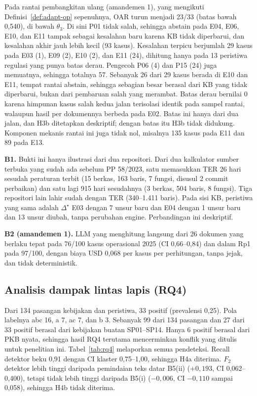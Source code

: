 \documentclass[conference]{IEEEtran}
\makeatletter
\DeclareRobustCommand{\en}[1]{{\usefont{\f@encoding}{\f@family}{\f@series}{it}#1\/}}
\newcommand{\emas}{\star}
\makeatother
\begin{document}
Pada rantai pembangkitan ulang (amandemen 1), yang mengikuti Definisi~\ref{def:adapt-op} sepenuhnya, OAR turun menjadi 23/33 (batas bawah 0,540), di bawah $\theta_3$. Di sini P01 tidak salah, sehingga \en{abstain} pada E04, E06, E10, dan E11 tampak sebagai kesalahan baru karena KB tidak diperbarui, dan kesalahan akhir jauh lebih kecil (93 kasus). Kesalahan terpicu berjumlah 29 kasus pada E03 (1), E09 (2), E10 (2), dan E11 (24), dihitung hanya pada 13 peristiwa regulasi yang punya batas derau. Pengecoh P06 (4) dan P15 (24) juga memuatnya, sehingga totalnya 57. Sebanyak 26 dari 29 kasus berada di E10 dan E11, tempat rantai \en{abstain}, sehingga sebagian besar berasal dari KB yang tidak diperbarui, bukan dari pembaruan salah yang merambat. Batas derau bernilai 0 karena himpunan kasus salah kedua jalan terisolasi identik pada sampel rantai, walaupun hasil per dokumennya berbeda pada E02. Batas ini hanya dari dua jalan, dan H3b ditetapkan deskriptif; dengan batas itu H3b tidak didukung. Komponen mekanis rantai ini juga tidak nol, misalnya 135 kasus pada E11 dan 89 pada E13.

\textbf{B1.} Bukti ini hanya ilustrasi dari dua repositori. Dari dua kalkulator sumber terbuka yang sudah ada sebelum PP 58/2023, satu memasukkan TER 26 hari sesudah peraturan terbit (15 berkas, 163 baris, 7 fungsi, disusul 2 \en{commit} perbaikan) dan satu lagi 915 hari sesudahnya (3 berkas, 504 baris, 8 fungsi). Tiga repositori lain lahir sudah dengan TER (340--1.411 baris). Pada sisi KB, peristiwa yang sama adalah $\Delta^{\emas}$ E03 dengan 7 unsur baru dan E04 dengan 1 unsur baru dan 13 unsur diubah, tanpa perubahan \en{engine}. Perbandingan ini deskriptif.

\textbf{B2 (amandemen 1).} LLM yang menghitung langsung dari 26 dokumen yang berlaku tepat pada 76/100 kasus operasional 2025 (CI 0,66--0,84) dan dalam Rp1 pada 97/100, dengan biaya USD 0,068 per kasus per perhitungan, tanpa jejak, dan tidak deterministik.

\subsection{Analisis dampak lintas lapis (RQ4)}
Dari 134 pasangan kebijakan dan peristiwa, 33 positif (prevalensi 0,25). Pola labelnya abc 16, a 7, ac 7, dan b 3. Sebanyak 99 dari 134 pasangan dan 27 dari 33 positif berasal dari kebijakan buatan SP01--SP14. Hanya 6 positif berasal dari PKB nyata, sehingga hasil RQ4 terutama mencerminkan konflik yang ditulis untuk penelitian ini. Tabel~\ref{tab:rq4} melaporkan semua pendeteksi. \en{Recall} detektor beku 0,91 dengan CI klaster 0,75--1,00, sehingga H4a diterima. $F_2$ detektor lebih tinggi daripada pemindaian teks datar B5(ii) ($+0{,}193$, CI 0,062--0,400), tetapi tidak lebih tinggi daripada B5(i) ($-0{,}006$, CI $-0{,}110$ sampai 0,058), sehingga H4b tidak diterima.
\end{document}
